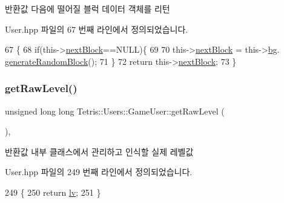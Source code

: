 \begin{DoxyReturn}{반환값}
다음에 떨어질 블럭 데이터 객체를 리턴 
\end{DoxyReturn}


User.\+hpp 파일의 67 번째 라인에서 정의되었습니다.


\begin{DoxyCode}
67                                      \{
68                     \textcolor{keywordflow}{if}(this->\hyperlink{class_tetris_1_1_users_1_1_game_user_a49be97be588cd4b6438f06ec693787d5}{nextBlock}==NULL)\{
69                         
70                         this->\hyperlink{class_tetris_1_1_users_1_1_game_user_a49be97be588cd4b6438f06ec693787d5}{nextBlock} = this->\hyperlink{class_tetris_1_1_users_1_1_game_user_ad57a39d1716322764d92ff76f08ebcd5}{bg}.
      \hyperlink{class_tetris_1_1_block_generator_a10dfe1467d40437ad41c5ae76437ad78}{generateRandomBlock}();
71                     \}
72                     \textcolor{keywordflow}{return} this->\hyperlink{class_tetris_1_1_users_1_1_game_user_a49be97be588cd4b6438f06ec693787d5}{nextBlock};
73                 \}
\end{DoxyCode}
\mbox{\label{class_tetris_1_1_users_1_1_game_user_a3e232d2f4a0610e51136bec11453858b}} 
\subsubsection{\texorpdfstring{get\+Raw\+Level()}{getRawLevel()}}
{\footnotesize\ttfamily unsigned long long Tetris\+::\+Users\+::\+Game\+User\+::get\+Raw\+Level (\begin{DoxyParamCaption}{ }\end{DoxyParamCaption})\hspace{0.3cm}{\ttfamily [inline]}, {\ttfamily [protected]}}

\begin{DoxyReturn}{반환값}
내부 클래스에서 관리하고 인식할 실제 레벨값 
\end{DoxyReturn}


User.\+hpp 파일의 249 번째 라인에서 정의되었습니다.


\begin{DoxyCode}
249                                             \{
250                 \textcolor{keywordflow}{return} \hyperlink{class_tetris_1_1_users_1_1_game_user_a11a2856fee30a69a19550b42c041a312}{lv};
251             \}
\end{DoxyCode}
\mbox{\label{class_tetris_1_1_users_1_1_game_user_a5912def4d9d77adbb4323b35366724af}} 

